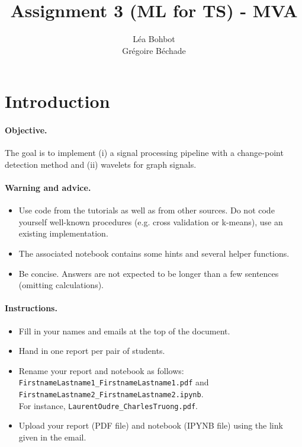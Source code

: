 \documentclass[11pt]{article}
\title{Assignment 3 (ML for TS) - MVA}
\author{
Léa Bohbot \email{lea.bohbot@polytechnique.edu} \\ %
Grégoire Béchade \email{gregoire.bechade@gmail.com} %
}
\begin{document}
\maketitle

\section{Introduction}

\paragraph{Objective.} The goal is to implement (i) a signal processing pipeline with a change-point detection method and (ii) wavelets for graph signals.

\paragraph{Warning and advice.} 
\begin{itemize}
    \item Use code from the tutorials as well as from other sources. Do not code yourself well-known procedures (e.g. cross validation or k-means), use an existing implementation.
    \item The associated notebook contains some hints and several helper functions.
    \item Be concise. Answers are not expected to be longer than a few sentences (omitting calculations).
\end{itemize}



\paragraph{Instructions.}
\begin{itemize}
    \item Fill in your names and emails at the top of the document.
    \item Hand in one report per pair of students.
    \item Rename your report and notebook as follows:\\ \texttt{FirstnameLastname1\_FirstnameLastname1.pdf} and\\ \texttt{FirstnameLastname2\_FirstnameLastname2.ipynb}.\\
    For instance, \texttt{LaurentOudre\_CharlesTruong.pdf}.
    \item Upload your report (PDF file) and notebook (IPYNB file) using the link given in the email.
\end{itemize}
\end{document}
